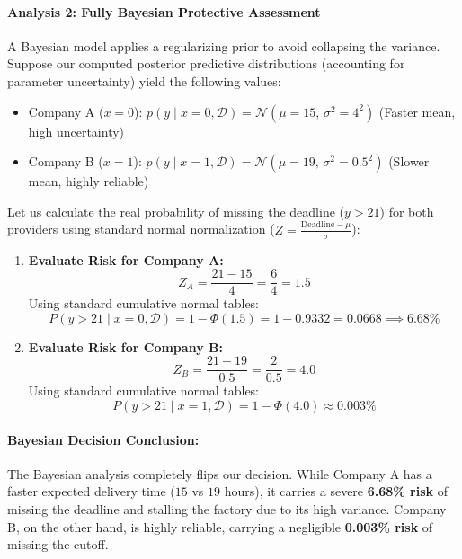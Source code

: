 \documentclass{article}
\begin{document}
\paragraph{Analysis 2: Fully Bayesian Protective Assessment}
A Bayesian model applies a regularizing prior to avoid collapsing the variance. Suppose our computed posterior predictive distributions (accounting for parameter uncertainty) yield the following values:
\begin{itemize}
    \item Company A ($x=0$): $p(y \mid x=0, \mathcal{D}) = \mathcal{N}(\mu = 15, \, \sigma^2 = 4^2)$ (Faster mean, high uncertainty)
    \item Company B ($x=1$): $p(y \mid x=1, \mathcal{D}) = \mathcal{N}(\mu = 19, \, \sigma^2 = 0.5^2)$ (Slower mean, highly reliable)
\end{itemize}

Let us calculate the real probability of missing the deadline ($y > 21$) for both providers using standard normal normalization ($Z = \frac{\text{Deadline} - \mu}{\sigma}$):

\begin{enumerate}
    \item \textbf{Evaluate Risk for Company A:}
    \begin{equation}
    Z_A = \frac{21 - 15}{4} = \frac{6}{4} = 1.5
    \end{equation}
    Using standard cumulative normal tables:
    \begin{equation}
    P(y > 21 \mid x=0, \mathcal{D}) = 1 - \Phi(1.5) = 1 - 0.9332 = 0.0668 \implies 6.68\%
    \end{equation}
    
    \item \textbf{Evaluate Risk for Company B:}
    \begin{equation}
    Z_B = \frac{21 - 19}{0.5} = \frac{2}{0.5} = 4.0
    \end{equation}
    Using standard cumulative normal tables:
    \begin{equation}
    P(y > 21 \mid x=1, \mathcal{D}) = 1 - \Phi(4.0) \approx 0.003\%
    \end{equation}
\end{enumerate}

\paragraph{Bayesian Decision Conclusion:}
The Bayesian analysis completely flips our decision. While Company A has a faster expected delivery time ($15$ vs $19$ hours), it carries a severe \textbf{6.68\% risk} of missing the deadline and stalling the factory due to its high variance. Company B, on the other hand, is highly reliable, carrying a negligible \textbf{0.003\% risk} of missing the cutoff. 
\end{document}
